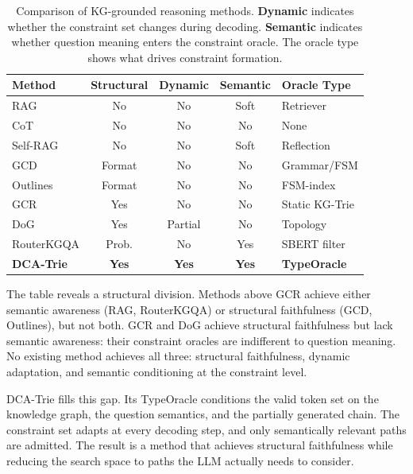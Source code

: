 \begin{table}[htpb]
  \centering
  \caption{Comparison of KG-grounded reasoning methods. \textbf{Dynamic} indicates
  whether the constraint set changes during decoding. \textbf{Semantic} indicates
  whether question meaning enters the constraint oracle. The oracle type shows what
  drives constraint formation.}
  \label{tab:related_comparison}
  \small
  \begin{tabular}{@{}lcccl@{}}
    \toprule
    Method        & Structural & Dynamic & Semantic & Oracle Type    \\
    \midrule
    RAG           & No         & No      & Soft     & Retriever      \\
    CoT           & No         & No      & No       & None           \\
    Self-RAG      & No         & No      & Soft     & Reflection     \\
    GCD           & Format     & No      & No       & Grammar/FSM    \\
    Outlines      & Format     & No      & No       & FSM-index      \\
    GCR           & Yes        & No      & No       & Static KG-Trie \\
    DoG           & Yes        & Partial & No       & Topology       \\
    RouterKGQA    & Prob.      & No      & Yes      & SBERT filter   \\
    \textbf{DCA-Trie} & \textbf{Yes} & \textbf{Yes} & \textbf{Yes} & \textbf{TypeOracle} \\
    \bottomrule
  \end{tabular}
\end{table}

The table reveals a structural division. Methods above GCR achieve either semantic
awareness (RAG, RouterKGQA) or structural faithfulness (GCD, Outlines), but not both.
GCR and DoG achieve structural faithfulness but lack semantic awareness: their constraint
oracles are indifferent to question meaning. No existing method achieves all three:
structural faithfulness, dynamic adaptation, and semantic conditioning at the constraint
level.

DCA-Trie fills this gap. Its TypeOracle conditions the valid token set on the knowledge
graph, the question semantics, and the partially generated chain. The constraint set
adapts at every decoding step, and only semantically relevant paths are admitted. The
result is a method that achieves structural faithfulness while reducing the search space
to paths the LLM actually needs to consider.
